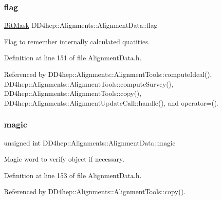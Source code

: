 \subsubsection{\texorpdfstring{flag}{flag}}
{\footnotesize\ttfamily \hyperlink{class_d_d4hep_1_1_alignments_1_1_alignment_data_ab5c31f7e5512ca675be8323bc723b123}{Bit\+Mask} D\+D4hep\+::\+Alignments\+::\+Alignment\+Data\+::flag\hspace{0.3cm}{\ttfamily [mutable]}}



Flag to remember internally calculated quatities. 



Definition at line 151 of file Alignment\+Data.\+h.



Referenced by D\+D4hep\+::\+Alignments\+::\+Alignment\+Tools\+::compute\+Ideal(), D\+D4hep\+::\+Alignments\+::\+Alignment\+Tools\+::compute\+Survey(), D\+D4hep\+::\+Alignments\+::\+Alignment\+Tools\+::copy(), D\+D4hep\+::\+Alignments\+::\+Alignment\+Update\+Call\+::handle(), and operator=().

\hypertarget{class_d_d4hep_1_1_alignments_1_1_alignment_data_a52652c8211546dca391a248a6f4c422a}{}\label{class_d_d4hep_1_1_alignments_1_1_alignment_data_a52652c8211546dca391a248a6f4c422a} 
\subsubsection{\texorpdfstring{magic}{magic}}
{\footnotesize\ttfamily unsigned int D\+D4hep\+::\+Alignments\+::\+Alignment\+Data\+::magic}



Magic word to verify object if necessary. 



Definition at line 153 of file Alignment\+Data.\+h.



Referenced by D\+D4hep\+::\+Alignments\+::\+Alignment\+Tools\+::copy().

\hypertarget{class_d_d4hep_1_1_alignments_1_1_alignment_data_ae7f0952d17a85f1061aa0b2967aff0ab}{}\label{class_d_d4hep_1_1_alignments_1_1_alignment_data_ae7f0952d17a85f1061aa0b2967aff0ab} 
